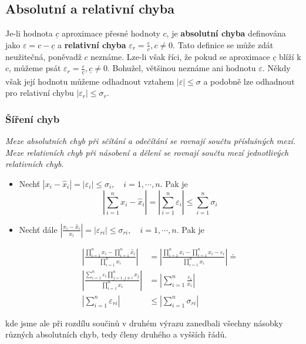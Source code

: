 {      \subsection{Absolutní a relativní chyba}
        Je-li hodnota $\underline{c}$ aproximace přesné hodnoty $c$, je \textbf{absolutní chyba}
        definována jako $\varepsilon=c-\underline{c}$ a \textbf{relativní chyba}
        $\varepsilon_r=\frac{\varepsilon}{c},c\neq0$. Tato definice se může zdát neužitečná, 
        poněvadž $c$ neznáme. Lze-li však říci, že pokud se aproximace $\underline{c}$ blíží k $c$, 
        můžeme psát $\varepsilon_r=\frac{\varepsilon}{\underline{c}},\underline{c}\neq0$. Bohužel, 
        většinou neznáme ani hodnotu $\varepsilon$. Někdy však její hodnotu můžeme odhadnout vztahem
        $|\varepsilon|\leq\sigma$ a podobně lze odhadnout pro relativní chybu 
        $|\varepsilon_r|\leq\sigma_r$.
      \subsubsection{Šíření chyb}
        \emph{Meze absolutních chyb při sčítání a odečítání se rovnají součtu pří\-sluš\-ných mezí.
        Meze relativních chyb při násobení a dělení se rovnají součtu mezí jednotlivých relativních
        chyb}.
        \begin{itemize}
          \item Nechť  $|x_i-\hat{x}_i|=|\varepsilon_i|\leq\sigma_i,\quad i=1,\cdots,n$. Pak je
               \begin{equation}\label{nm:eq_sireni_abs_err}
                 |\sum_{i=1}^n{x_i-\hat{x}_i}|=|\sum_{i=1}^n{\varepsilon_i}|\leq\sum_{i=1}^n{\sigma_i}
               \end{equation}
  
          \item Nechť dále $|\frac{x_i-\hat{x}_i}{x_i}|=|\varepsilon_{ri}|\leq\sigma_{ri},\quad
                i=1,\cdots,n$. Pak je
  
               \begin{align*}\label{nm:eq_sireni_rel_err}
                 |\frac{\prod_{i=1}^n{x_i}-\prod_{i=1}^n{\hat{x}_i}}{\prod_{i=1}^n{x_i}}|      &=
                             |\frac{\prod_{i=1}^n{x_i}-\prod_{i=1}^n{x_i-\varepsilon_i}}
                             {\prod_{i=1}^n{x_i}}|\doteq                                            
                             \\  
                 |\frac{\sum_{i=1}^n{\varepsilon_i}\prod_{j=1,j\neq i}^n{x_j}}
                             {\prod_{i=1}^n{x_i}}|                                             &=
                             |\sum_{i=1}^n{\frac{\varepsilon_i}{x_i}}|                              
                             \\
                 |\sum_{i=1}^n{\varepsilon_{ri}}|                                              &\leq
                             |\sum_{i=1}^n{\sigma_{ri}}|
              \end{align*}
        \end{itemize}
        kde jsme ale při rozdílu součinů v druhém výrazu zanedbali všechny násobky různých
        absolutních chyb, tedy členy druhého a vyšších řádů.
  
}
